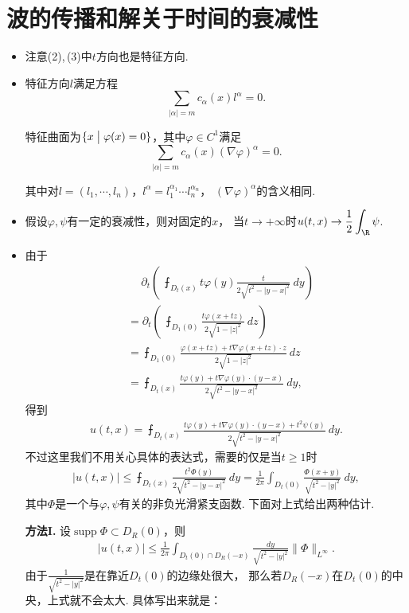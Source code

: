 \section{波的传播和解关于时间的衰减性}
\begin{itemize}

\item[1.] 注意(2),\,(3)中$t$方向也是特征方向.

\item[3.] 特征方向$l$满足方程
$$\sum_{|\alpha|=m}c_\alpha(x)l^\alpha=0.$$

特征曲面为$\{x\bigm|\varphi(x)=0\}$，其中$\varphi\in C^1$满足
$$\sum_{|\alpha|=m}c_\alpha(x)(\nabla\varphi)^\alpha=0.$$

其中对$l=(l_1,\cdots,l_n)$，$l^\alpha=l_1^{\alpha_1}\cdots l_n^{\alpha_n}$，
$(\nabla\varphi)^\alpha$的含义相同.

\item[4.] 假设$\varphi,\psi$有一定的衰减性，则对固定的$x$，
当$t\rightarrow+\infty$时$\displaystyle{u(t,x)\rightarrow\frac{1}{2}\int_\R\psi}$.

\item[5.] 由于\begin{align*}
    &\quad\ \partial_t\left(\ \intbar_{\!\!\!D_t(x)}t\varphi(y)\frac{t}{2\sqrt{t^2-|y-x|^2}}\>dy\right)\\
    &=\partial_t\left(\ \intbar_{\!\!\!D_1(0)}\frac{t\varphi(x+tz)}{2\sqrt{1-|z|^2}}\>dz\right)\\
    &=\intbar_{\!\!\!D_1(0)}\frac{\varphi(x+tz)+t\nabla\varphi(x+tz)\cdot z}{2\sqrt{1-|z|^2}}\>dz\\
    &=\intbar_{\!\!\!D_t(x)}\frac{t\varphi(y)+t\nabla\varphi(y)\cdot(y-x)}{2\sqrt{t^2-|y-x|^2}}\>dy,
\end{align*}
得到
\begin{align*}
    u(t,x)=\intbar_{\!\!\!D_t(x)}\frac{t\varphi(y)
    +t\nabla\varphi(y)\cdot(y-x)+t^2\psi(y)}{2\sqrt{t^2-|y-x|^2}}\>dy.
\end{align*}
不过这里我们不用关心具体的表达式，需要的仅是当$t\geqslant1$时
\begin{align*}
    |u(t,x)|\leqslant\intbar_{\!\!\!D_t(x)}\frac{t^2\varPhi(y)}{2\sqrt{t^2-|y-x|^2}}\>dy
    =\frac{1}{2\pi}\int_{D_t(0)}\frac{\varPhi(x+y)}{\sqrt{t^2-|y|^2}}\>dy,
\end{align*}
其中$\varPhi$是一个与$\varphi,\psi$有关的非负光滑紧支函数. 下面对上式给出两种估计.

\textbf{方法I.} 设$\operatorname{supp}\varPhi\subset D_R(0)$，则
\begin{align*}
    |u(t,x)|\leqslant\frac{1}{2\pi}\int_{D_t(0)\cap D_R(-x)}\frac{dy}{\sqrt{t^2-|y|^2}}\|\varPhi\|_{L^\infty}.
\end{align*}
由于$\frac{1}{\sqrt{t^2-|y|^2}}$是在靠近$D_t(0)$的边缘处很大，
那么若$D_R(-x)$在$D_t(0)$的中央，上式就不会太大. 具体写出来就是：


\end{itemize}
